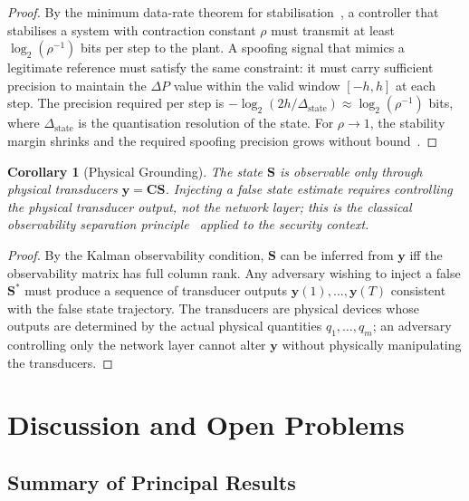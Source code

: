 \documentclass[10pt,twocolumn]{article}
\theoremstyle{plain}
\newtheorem{corollary}[theorem]{Corollary}
\theoremstyle{definition}
\theoremstyle{remark}
\newcommand{\DeltaP}{\Delta P}
\newcommand{\Sstar}{\mathbf{S}^{*}}
\begin{document}
\begin{proof}
By the minimum data-rate theorem for stabilisation~\cite{Nair2004},
a controller that stabilises a system with contraction constant $\rho$
must transmit at least $\log_2(\rho^{-1})$ bits per step to the plant.
A spoofing signal that mimics a legitimate reference must satisfy the
same constraint: it must carry sufficient precision to maintain the
$\DeltaP$ value within the valid window $[-h,h]$ at each step.
The precision required per step is $-\log_2(2h/\Delta_{\mathrm{state}})
\approx \log_2(\rho^{-1})$ bits, where $\Delta_{\mathrm{state}}$
is the quantisation resolution of the state.  For $\rho \to 1$, the
stability margin shrinks and the required spoofing precision grows
without bound~\cite{Nair2004}.
\end{proof}

\begin{corollary}[Physical Grounding]
\label{cor:physical}
The state $\mathbf{S}$ is observable only through physical transducers
$\mathbf{y} = \mathbf{C}\mathbf{S}$.  Injecting a false state estimate
requires controlling the physical transducer output, not the network
layer; this is the classical observability separation
principle~\cite{Luenberger1979} applied to the security context.
\end{corollary}

\begin{proof}
By the Kalman observability condition, $\mathbf{S}$ can be inferred
from $\mathbf{y}$ iff the observability matrix has full column rank.
Any adversary wishing to inject a false $\Sstar$ must produce a
sequence of transducer outputs $\mathbf{y}(1),\ldots,\mathbf{y}(T)$
consistent with the false state trajectory.  The transducers are
physical devices whose outputs are determined by the actual physical
quantities $q_1,\ldots,q_m$; an adversary controlling only the network
layer cannot alter $\mathbf{y}$ without physically manipulating the
transducers.
\end{proof}

\section{Discussion and Open Problems}
\label{sec:discussion}

\subsection{Summary of Principal Results}
\end{document}
